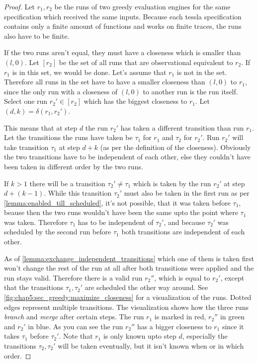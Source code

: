 \begin{proof}\label{proof:equiv_greedy_engines}
  Let \(r_1, r_2\) be the runs of two greedy evaluation engines for the same specification which received the same inputs.
  Because each \gls{tessla} specification contains only a finite amount of functions and works on finite traces, the runs also have to be finite.

  If the two runs aren't equal, they must have a closeness which is smaller than \((l, 0)\).
  Let \([r_2]\) be the set of all runs that are observational equivalent to \(r_2\).
  If \(r_1\) is in this set, we would be done.
  Let's assume that \(r_1\) is not in the set.
  Therefore all runs in the set have to have a smaller closeness than \((l,0)\) to \(r_1\), since the only run with a closeness of \((l,0)\) to another run is the run itself.
  Select one run \(r_2' \in [r_2]\) which has the biggest closeness to \(r_1\).
  Let \((d,k) = \delta(r_1, r_2')\).

  This means that at step \(d\) the run \(r_2'\) has taken a different transition than run \(r_1\).
  Let the transitions the runs have taken be \(\tau_1\) for \(r_1\) and \(\tau_2\) for \(r_2'\).
  Run \(r_2'\) will take transition \(\tau_1\) at step \(d+k\) (as per the definition of the closeness).
  Obviously the two transitions have to be independent of each other, else they couldn't have been taken in different order by the two runs.

  If \(k > 1\) there will be a transition \(\tau_2' \neq \tau_1\) which is taken by the run \(r_2'\) at step \(d+(k-1)\).
  While this transition \(\tau_2'\) must also be taken in the first run as per \cref{lemma:enabled_till_scheduled}, it's not possible, that it was taken before \(\tau_1\), beause then the two runs wouldn't have been the same upto the point where \(\tau_1\) was taken.
  Therefore \(\tau_1\) has to be independent of \(\tau_2'\), and because \(\tau_2'\) was scheduled by the second run before \(\tau_1\) both transitions are independent of each other.

  As of \cref{lemma:exchange_independent_transitions} which one of them is taken first won't change the rest of the run at all after both transitions were applied and the run stays valid.
  Therefore there is a valid run \(r_2''\), which is equal to \(r_2'\), except that the transitions \(\tau_1, \tau_2'\) are scheduled the other way around.
  See \cref{fig:chap5:sec_greedy:maximize_closeness} for a visualization of the runs.
  Dotted edges represent multiple transitions. The visualization shows how the three runs \emph{branch} and \emph{merge} after certain steps.
  The run \(r_1\) is marked in red, \(r_2''\) in green and \(r_2'\) in blue.
  As you can see the run \(r_2''\) has a bigger closeness to \(r_1\) since it takes \(\tau_1\) before \(\tau_2'\).
  Note that \(r_1\) is only known upto step \(d\), especially the transitions \(\tau_2, \tau_2'\) will be taken eventually, but it isn't known when or in which order.


\end{proof}
